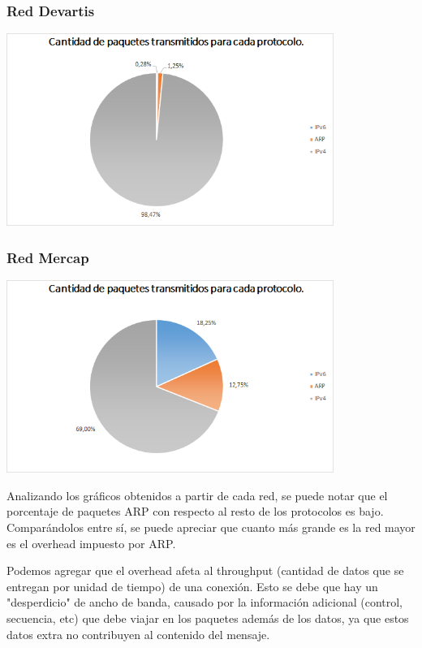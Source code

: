\subsubsection{Red Devartis}

\centerline{\includegraphics[width=0.8\textwidth]{./graficos/paquetesVSProtocolo/laburo_mari2.png}}

\subsubsection{Red Mercap}

\centerline{\includegraphics[width=0.8\textwidth]{./graficos/paquetesVSProtocolo/laburo_eze2.png}}


Analizando los gráficos obtenidos a partir de cada red, se puede notar que el porcentaje de paquetes ARP con respecto al resto de los protocolos es bajo. Comparándolos entre sí, se puede apreciar que cuanto más grande es la red mayor es el overhead impuesto por ARP.

Podemos agregar que el overhead afeta al throughput (cantidad de datos que se entregan por unidad de tiempo) de una conexión. Esto se debe que hay un "desperdicio" de ancho de banda, causado por la información adicional (control, secuencia, etc) que debe viajar en los paquetes además de los datos, ya que estos datos extra no contribuyen al contenido del mensaje.
